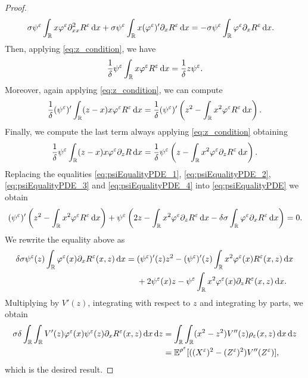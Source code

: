 \documentclass[10pt]{article}
\begin{document}
\begin{proof}
\begin{equation}\label{eq:psiEqualityPDE_1}
\begin{aligned}
	\sigma \psi^\varepsilon \int_{\mathbb{R}}  x \varphi^\varepsilon \partial^2_{xx} R^\varepsilon \,\mathrm{d} x+ \sigma \psi^\varepsilon \int_{\mathbb{R}} x (\varphi^\varepsilon)' \partial_x R^\varepsilon \,\mathrm{d} x &= -\sigma \psi^\varepsilon \int_{\mathbb{R}} \varphi^\varepsilon \partial_x R^\varepsilon \,\mathrm{d} x.
\end{aligned}
\end{equation}
Then, applying \eqref{eq:z_condition}, we have
\begin{equation}\label{eq:psiEqualityPDE_2}
	\frac1\delta \psi^\varepsilon \int_{\mathbb{R}} x \varphi^\varepsilon  R^\varepsilon \,\mathrm{d} x = \frac1\delta z \psi^\varepsilon.
\end{equation}
Moreover, again applying \eqref{eq:z_condition}, we can compute
\begin{equation}\label{eq:psiEqualityPDE_3}
\begin{aligned}
	\frac1\delta (\psi^\varepsilon)' \int_{\mathbb{R}} (z-x)x \varphi^\varepsilon  R^\varepsilon \,\mathrm{d} x = \frac1\delta (\psi^\varepsilon)' \left(z^2 - \int_{\mathbb{R}} x^2 \varphi^\varepsilon R^\varepsilon \,\mathrm{d} x\right).
\end{aligned}
\end{equation}
Finally, we compute the last term always applying \eqref{eq:z_condition} obtaining
\begin{equation}\label{eq:psiEqualityPDE_4}
	\frac1\delta \psi^\varepsilon \int_{\mathbb{R}} (z-x)x \varphi^\varepsilon \partial_z R \,\mathrm{d} x = \frac1\delta \psi^\varepsilon\left(z - \int_{\mathbb{R}} x^2 \varphi^\varepsilon \partial_z R^\varepsilon \,\mathrm{d} x\right).
\end{equation}
Replacing the equalities \eqref{eq:psiEqualityPDE_1}, \eqref{eq:psiEqualityPDE_2}, \eqref{eq:psiEqualityPDE_3} and \eqref{eq:psiEqualityPDE_4} into \eqref{eq:psiEqualityPDE} we obtain
\begin{equation}
(\psi^\varepsilon)' \left ( z^2 - \int_{\mathbb{R}} x^2 \varphi^\varepsilon R^\varepsilon \,\mathrm{d} x \right ) + \psi^\varepsilon \left ( 2z - \int_{\mathbb{R}} x^2 \varphi^\varepsilon \partial_z R^\varepsilon \,\mathrm{d} x - \delta \sigma \int_{\mathbb{R}} \varphi^\varepsilon \partial_x R^\varepsilon \,\mathrm{d} x \right ) = 0.
\end{equation}
We rewrite the equality above as
\begin{equation} \label{eq:psiEquality}
\delta \sigma \psi^\varepsilon(z) \int_{\mathbb{R}} \varphi^\varepsilon(x) \partial_x R^\varepsilon(x, z) \,\mathrm{d} x = 
\begin{aligned}[t] &(\psi^\varepsilon)'(z) z^2 - (\psi^\varepsilon)'(z) \int_{\mathbb{R}} x^2 \varphi^\varepsilon(x) R^\varepsilon(x, z) \,\mathrm{d} x \\
& + 2 \psi^\varepsilon(x) z - \psi^\varepsilon \int_{\mathbb{R}} x^2 \varphi^\varepsilon(x) \partial_z R^\varepsilon(x, z) \,\mathrm{d} x.
\end{aligned}
\end{equation}
Multiplying by $V'(z)$, integrating with respect to $z$ and integrating by parts, we obtain
\begin{equation}
\begin{aligned}
\sigma \delta \int_{\mathbb{R}} \int_{\mathbb{R}} V'(z) \varphi^\varepsilon(x) \psi^\varepsilon(z) \partial_x R^\varepsilon(x,z) \,\mathrm{d} x \,\mathrm{d} z &=  \int_{\mathbb{R}} \int_{\mathbb{R}} (x^2 - z^2) V''(z) \rho_\varepsilon(x,z) \,\mathrm{d} x \,\mathrm{d} z \\
&= \operatorname{\mathbb{E}}^{\rho^\varepsilon}[((X^\varepsilon)^2 - (Z^\varepsilon)^2)V''(Z^\varepsilon)],
\end{aligned}
\end{equation}
which is the desired result.


\end{proof}
\end{document}
